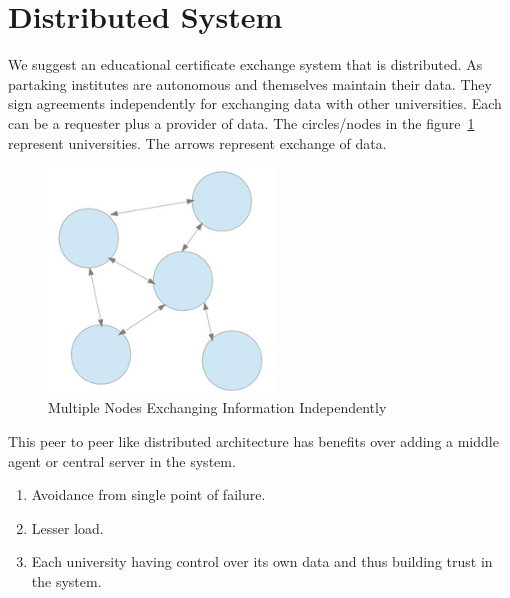 \documentclass[12pt,a4paper,oneside]{book}
\begin{document}


	


\section{Distributed System}
We suggest an educational certificate exchange system that is distributed. As partaking institutes are autonomous and themselves maintain their data. They sign agreements independently for exchanging data with other universities. Each can be a requester plus a provider of data. The circles/nodes in the figure~\ref{fig:architecture_distributed_independent_exchange} represent universities. The arrows represent exchange of data. \\

\begin{figure}[!htp]
  \centering
  \includegraphics[width=6cm]{architecture_distributed_independent_exchange.png}
  \caption{Multiple Nodes Exchanging Information Independently \cite{The Mobility Project}}
  \label{fig:architecture_distributed_independent_exchange}
\end{figure}

This peer to peer like distributed architecture has benefits over adding a middle agent or central server in the system.

\begin{enumerate}
\item Avoidance from single point of failure.
\item Lesser load.
\item Each university having control over its own data and thus building trust in the system.	
\end{enumerate}
\end{document}
